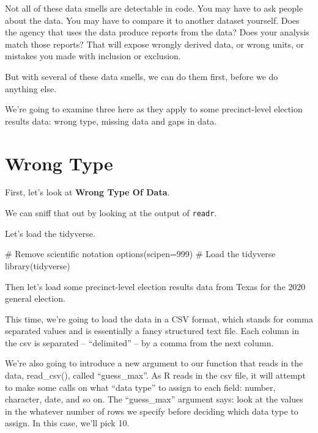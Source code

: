 \documentclass[
  letterpaper,
  DIV=11,
  numbers=noendperiod]{scrreprt}
\newenvironment{Shaded}{\begin{snugshade}}{\end{snugshade}}
\newcommand{\AttributeTok}[1]{\textcolor[rgb]{0.40,0.45,0.13}{#1}}
\newcommand{\CommentTok}[1]{\textcolor[rgb]{0.37,0.37,0.37}{#1}}
\newcommand{\DecValTok}[1]{\textcolor[rgb]{0.68,0.00,0.00}{#1}}
\newcommand{\FunctionTok}[1]{\textcolor[rgb]{0.28,0.35,0.67}{#1}}
\newcommand{\NormalTok}[1]{\textcolor[rgb]{0.00,0.23,0.31}{#1}}
\begin{document}
Not all of these data smells are detectable in code. You may have to ask
people about the data. You may have to compare it to another dataset
yourself. Does the agency that uses the data produce reports from the
data? Does your analysis match those reports? That will expose wrongly
derived data, or wrong units, or mistakes you made with inclusion or
exclusion.

But with several of these data smells, we can do them first, before we
do anything else.

We're going to examine three here as they apply to some precinct-level
election results data: wrong type, missing data and gaps in data.

\hypertarget{wrong-type}{%
\section{Wrong Type}\label{wrong-type}}

First, let's look at \textbf{Wrong Type Of Data}.

We can sniff that out by looking at the output of \texttt{readr}.

Let's load the tidyverse.

\begin{Shaded}
\begin{Highlighting}[]
\CommentTok{\# Remove scientific notation}
\FunctionTok{options}\NormalTok{(}\AttributeTok{scipen=}\DecValTok{999}\NormalTok{)}
\CommentTok{\# Load the tidyverse}
\FunctionTok{library}\NormalTok{(tidyverse)}
\end{Highlighting}
\end{Shaded}

Then let's load some precinct-level election results data from Texas for
the 2020 general election.

This time, we're going to load the data in a CSV format, which stands
for comma separated values and is essentially a fancy structured text
file. Each column in the csv is separated -- ``delimited'' -- by a comma
from the next column.

We're also going to introduce a new argument to our function that reads
in the data, read\_csv(), called ``guess\_max''. As R reads in the csv
file, it will attempt to make some calls on what ``data type'' to assign
to each field: number, character, date, and so on. The ``guess\_max''
argument says: look at the values in the whatever number of rows we
specify before deciding which data type to assign. In this case, we'll
pick 10.
\end{document}
